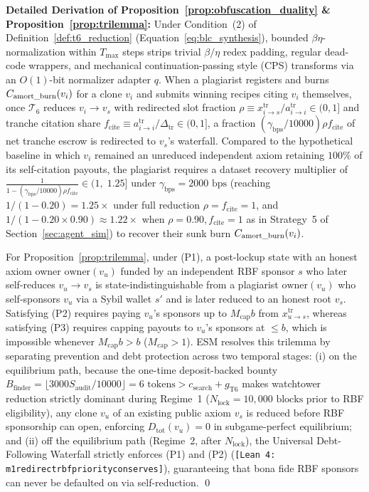 \documentclass[runningheads,a4paper]{llncs}
\renewcommand{\_}{\textunderscore\allowbreak}
\newcommand{\leanref}[1]{{\footnotesize\texttt{[Lean 4: #1]}}}
\begin{document}
\textbf{Detailed Derivation of Proposition~\ref{prop:obfuscation_duality} \& Proposition~\ref{prop:trilemma}:} Under Condition~(2) of Definition~\ref{def:t6_reduction} (Equation~\eqref{eq:blc_synthesis}), bounded $\beta\eta$-normalization within $T_{\max}$ steps strips trivial $\beta/\eta$ redex padding, regular dead-code wrappers, and mechanical continuation-passing style (CPS) transforms via an $O(1)$-bit normalizer adapter $q$. When a plagiarist registers and burns $C_{\text{amort\_burn}}(v_i)$ for a clone $v_i$ and submits winning recipes citing $v_i$ themselves, once $\mathcal{T}_6$ reduces $v_i \to v_s$ with redirected slot fraction $\rho \equiv x_{i \to s}^{\text{tr}} / a_{i \to i}^{\text{tr}} \in (0,\allowbreak 1]$ and tranche citation share $f_{\text{cite}} \equiv a_{i \to i}^{\text{tr}} / \Delta_{\text{tr}} \in (0,\allowbreak 1]$, a fraction $(\gamma_{\text{bps}}/10000) \rho f_{\text{cite}}$ of net tranche escrow is redirected to $v_s$'s waterfall. Compared to the hypothetical baseline in which $v_i$ remained an unreduced independent axiom retaining $100\%$ of its self-citation payouts, the plagiarist requires a dataset recovery multiplier of $\frac{1}{1 - (\gamma_{\text{bps}}/10000) \rho f_{\text{cite}}} \in (1,\allowbreak \; 1.25]$ under $\gamma_{\text{bps}} = 2000\text{ bps}$ (reaching $1 / (1 - 0.20) = 1.25\times$ under full reduction $\rho = f_{\text{cite}} = 1$, and $1 / (1 - 0.20 \times 0.90) \approx 1.22\times$ when $\rho = 0.90,\allowbreak f_{\text{cite}} = 1$ as in Strategy~5 of Section~\ref{sec:agent_sim}) to recover their sunk burn $C_{\text{amort\_burn}}(v_i)$.

For Proposition~\ref{prop:trilemma}, under (P1), a post-lockup state with an honest axiom owner $\text{owner}(v_u)$ funded by an independent RBF sponsor $s$ who later self-reduces $v_u \to v_s$ is state-indistinguishable from a plagiarist $\text{owner}(v_u)$ who self-sponsors $v_u$ via a Sybil wallet $s'$ and is later reduced to an honest root $v_s$. Satisfying (P2) requires paying $v_u$'s sponsors up to $M_{\text{cap}} b$ from $x_{u \to s}^{\text{tr}}$, whereas satisfying (P3) requires capping payouts to $v_u$'s sponsors at $\le b$, which is impossible whenever $M_{\text{cap}} b > b$ ($M_{\text{cap}} > 1$). ESM resolves this trilemma by separating prevention and debt protection across two temporal stages: (i) on the equilibrium path, because the one-time deposit-backed bounty $B_{\text{finder}} = \lfloor 3000 S_{\text{audit}} / 10000 \rfloor = 6\text{ tokens} > c_{\text{search}} + g_{\text{T6}}$ makes watchtower reduction strictly dominant during Regime~1 ($N_{\text{lock}} = 10,000\text{ blocks}$ prior to RBF eligibility), any clone $v_u$ of an existing public axiom $v_s$ is reduced before RBF sponsorship can open, enforcing $D_{\text{tot}}(v_u) = 0$ in subgame-perfect equilibrium; and (ii) off the equilibrium path (Regime~2, after $N_{\text{lock}}$), the Universal Debt-Following Waterfall strictly enforces (P1) and (P2) (\leanref{m1\_redirect\_rbf\_priority\_conserves}), guaranteeing that bona fide RBF sponsors can never be defaulted on via self-reduction. \qed
\end{document}
